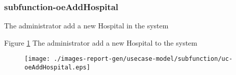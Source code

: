 \subsubsection{subfunction-oeAddHospital}

\label{RE-use-case-oeAddHospital}


The administrator add a new Hospital in the system		  


\begin{usecase}
  






\addnumberedsinglerow{}{
}



\end{usecase} 

Figure \ref{fig:lu.uni.lassy.excalibur.examples.icrash-RE-UCD-uc-oeAddHospital}
The administrator add a new Hospital to the system

\begin{figure}[htbp]
\begin{center}

\texttt{[image: ./images-report-gen/usecase-model/subfunction/uc-oeAddHospital.eps]}
\end{center}
\caption[lu.uni.lassy.excalibur.examples.icrash Use Case Diagram: uc-oeAddHospital]{}
\label{fig:lu.uni.lassy.excalibur.examples.icrash-RE-UCD-uc-oeAddHospital}
\end{figure}
\vspace{0.5cm}
